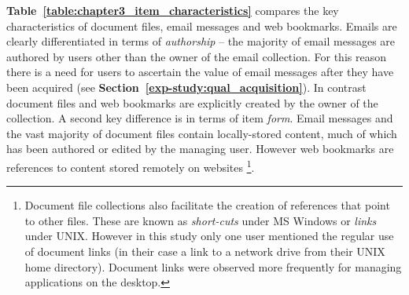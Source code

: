 \textbf{Table~\ref{table:chapter3_item_characteristics}} compares the key characteristics of document files, email messages and web bookmarks. 
Emails are clearly differentiated in terms of \textit{authorship} -- the majority of email messages are authored by users other than the owner of the email collection.
For this reason there is a need for users to ascertain the value of email messages after they have been acquired (see \textbf{Section~\ref{exp-study:qual_acquisition}}).
In contrast document files and web bookmarks are explicitly created by the owner of the collection.  
A second key difference is in terms of item \textit{form}.
Email messages and the vast majority of document files contain locally-stored content, much of which has been authored or edited by the managing user.
However web bookmarks are references to content stored remotely on websites
\footnote{Document file collections also facilitate the creation of references that point to other files. These are known as \textit{short-cuts} under MS Windows or \textit{links} under UNIX. However in this study only one user mentioned the regular use of document links (in their case a link to a network drive from their UNIX home directory). Document links were observed more frequently for managing applications on the desktop.}.

